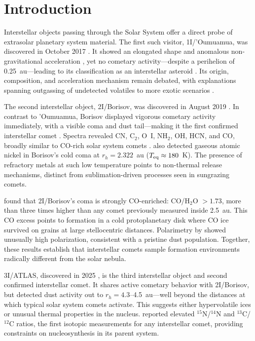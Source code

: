 \documentclass[preprint2]{aastex631}
\begin{document}

\section{Introduction}\label{sec:intro}

Interstellar objects passing through the Solar System offer a direct probe of extrasolar planetary system material. The first such visitor, 1I/'Oumuamua, was discovered in October 2017 \citep{meech17}. It showed an elongated shape and anomalous non-gravitational acceleration \citep{micheli18}, yet no cometary activity---despite a perihelion of 0.25~au---leading to its classification as an interstellar asteroid \citep{jewitt17}. Its origin, composition, and acceleration mechanism remain debated, with explanations spanning outgassing of undetected volatiles \citep{seligman23} to more exotic scenarios \citep{loeb18}.

The second interstellar object, 2I/Borisov, was discovered in August 2019 \citep{guzik19}. In contrast to 'Oumuamua, Borisov displayed vigorous cometary activity immediately, with a visible coma and dust tail---making it the first confirmed interstellar comet \citep{jewitt19}. Spectra revealed CN, C$_{2}$, O~I, NH$_{2}$, OH, HCN, and CO, broadly similar to CO-rich solar system comets \citep{fitzsimmons19,bodewits20}. \citet{guzik21} also detected gaseous atomic nickel in Borisov's cold coma at $r_h = 2.322$~au ($T_{\rm eq} \approx 180$~K). The presence of refractory metals at such low temperature points to non-thermal release mechanisms, distinct from sublimation-driven processes seen in sungrazing comets.

\citet{bodewits20} found that 2I/Borisov's coma is strongly CO-enriched: CO/H$_{2}$O $> 1.73$, more than three times higher than any comet previously measured inside 2.5~au. This CO excess points to formation in a cold protoplanetary disk where CO ice survived on grains at large stellocentric distances. Polarimetry by \citet{bagnulo22} showed unusually high polarization, consistent with a pristine dust population. Together, these results establish that interstellar comets sample formation environments radically different from the solar nebula.

3I/ATLAS, discovered in 2025 \citep{atlas25}, is the third interstellar object and second confirmed interstellar comet. It shares active cometary behavior with 2I/Borisov, but \citet{pratik26} detected dust activity out to $r_h = 4.3$--4.5~au---well beyond the distances at which typical solar system comets activate. This suggests either hypervolatile ices or unusual thermal properties in the nucleus. \citet{opitom26} reported elevated $^{15}$N/$^{14}$N and $^{13}$C/$^{12}$C ratios, the first isotopic measurements for any interstellar comet, providing constraints on nucleosynthesis in its parent system.
\end{document}
